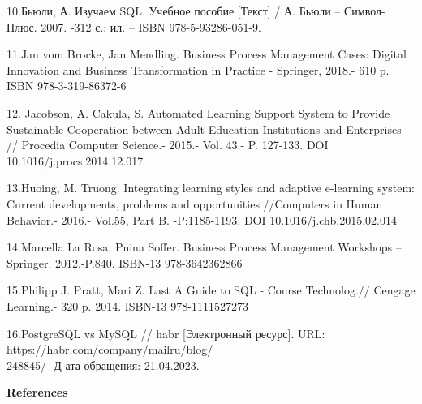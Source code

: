 \begin{noparindent}
10.Бьюли, А. Изучаем SQL. Учебное пособие {[}Текст{]} / А. Бьюли --
Символ-Плюс. 2007. -312 с.: ил. -- ISBN 978-5-93286-051-9.

11.Jan vom Brocke, Jan Mendling. Business Process Management Cases:
Digital Innovation and Business Transformation in Practice - Springer,
2018.- 610 p. ISBN 978-3-319-86372-6

12. Jacobson, A. Cakula, S. Automated Learning Support System to Provide
Sustainable Cooperation between Adult Education Institutions and
Enterprises // Procedia Computer Science.- 2015.- Vol. 43.- P. 127-133.
DOI 10.1016/j.procs.2014.12.017

13.Huoing, M. Truong. Integrating learning styles and adaptive
e-learning system: Current developments, problems and opportunities
//Computers in Human Behavior.- 2016.- Vol.55, Part B. -P:1185-1193. DOI
10.1016/j.chb.2015.02.014

14.Marcella La Rosa, Pnina Soffer. Business Process Management Workshops
-- Springer. 2012.-P.840. ISBN-13 978-3642362866

15.Philipp J. Pratt, Mari Z. Last A Guide to SQL - Course Technolog.//
Cengage Learning.- 320 p. 2014. ISBN-13 978-1111527273

16.PostgreSQL vs MySQL // habr {[}Электронный ресурс{]}. URL:
https://habr.com/company/mailru/blog/\\248845/ -Д ата обращения:
21.04.2023.

\end{noparindent}

\begin{center}
  {\bfseries References}
\end{center}

